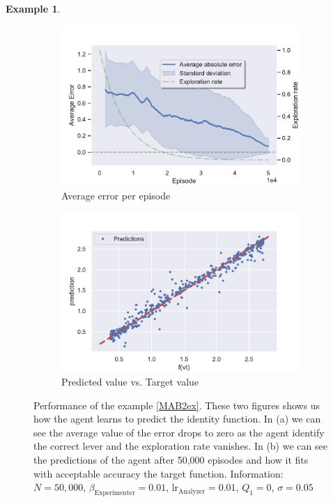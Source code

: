 \documentclass[11pt,a4paper,twoside]{report}
\newcommand{\+}{\textnormal{+} }
\theoremstyle{definition}
\newtheorem{myex}[mythm]{Example}
\numberwithin{equation}{chapter}
\begin{document}
\begin{myex}
  

    \begin{figure}[]
      \centering
      \begin{subfigure}{.5\textwidth}
        \centering
        \includegraphics[width=1\linewidth]{figures/Error-MAB2.pdf}
        \caption{Average error per episode}
        \label{fig:ErrorAverageMAB2}
      \end{subfigure}%
      \begin{subfigure}{.5\textwidth}
        \centering
        \includegraphics[width=1\linewidth]{figures/predictions-MAB2.pdf}
        \caption{Predicted value vs. Target value}
        \label{fig:predictionsMAB2}
      \end{subfigure}
      \caption{Performance of the example \ref{MAB2ex}. These two figures shows
      us how the agent learns to predict the identity function. In (a) we can see
      the average value of the error drops to zero as the agent identify
      the correct lever and the exploration rate vanishes. In (b) we can see the
      predictions of the agent after 50,000 episodes and how it fits with
      acceptable accuracy the target function. Information: $N=50,000$,
      $\beta_\text{Experimenter}=0.01$, $\text{lr}_\text{Analyzer}=0.01$,
      $Q_1=0$, $\sigma=0.05$}
    \end{figure} 
  \end{myex}
\end{document}

